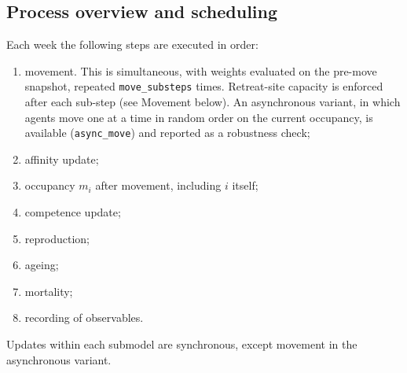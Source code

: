 \documentclass[preprint,12pt,authoryear]{elsarticle}
\begin{document}
\subsection*{Process overview and scheduling}
Each week the following steps are executed in order:
\begin{enumerate}
\item movement. This is simultaneous, with weights evaluated on the pre-move snapshot, repeated
  \texttt{move\_substeps} times. Retreat-site capacity is enforced after each sub-step (see Movement below). An asynchronous
  variant, in which agents move one at a time in random order on the current occupancy, is available
  (\texttt{async\_move}) and reported as a robustness check;
\item affinity update;
\item occupancy $m_i$ after movement, including $i$ itself;
\item competence update;
\item reproduction;
\item ageing;
\item mortality;
\item recording of observables.
\end{enumerate}
Updates within each submodel are synchronous, except movement in the asynchronous variant.
\end{document}
